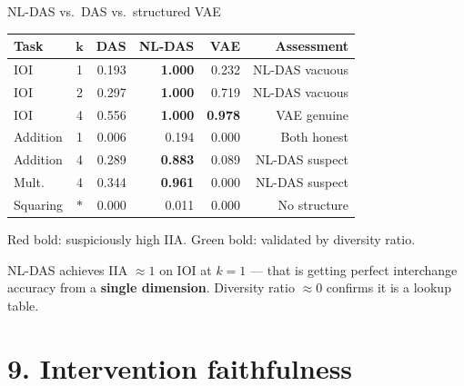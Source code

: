 \documentclass[aspectratio=169,11pt]{beamer}
\begin{document}
\begin{frame}{NL-DAS vs.\ DAS vs.\ structured VAE}

\centering
{\small\setlength{\tabcolsep}{4pt}
\begin{tabular}{lc rrrr}
\toprule
\textbf{Task} & $\boldsymbol{k}$ & \textbf{DAS} & \textbf{NL-DAS} & \textbf{VAE} & \textbf{Assessment} \\
\midrule
IOI & 1 & 0.193 & \textcolor{fail}{\textbf{1.000}} & 0.232 & NL-DAS vacuous \\
IOI & 2 & 0.297 & \textcolor{fail}{\textbf{1.000}} & 0.719 & NL-DAS vacuous \\
IOI & 4 & 0.556 & \textcolor{fail}{\textbf{1.000}} & \textcolor{pass}{\textbf{0.978}} & VAE genuine \\
Addition & 1 & 0.006 & 0.194 & 0.000 & Both honest \\
Addition & 4 & 0.289 & \textcolor{fail}{\textbf{0.883}} & 0.089 & NL-DAS suspect \\
Mult. & 4 & 0.344 & \textcolor{fail}{\textbf{0.961}} & 0.000 & NL-DAS suspect \\
Squaring & $*$ & 0.000 & 0.011 & 0.000 & No structure \\
\bottomrule
\end{tabular}}

\vspace{0.5em}
{\small \textcolor{fail}{Red bold}: suspiciously high IIA. \textcolor{pass}{Green bold}: validated by diversity ratio.}

\vspace{0.3em}
{\small NL-DAS achieves IIA $\approx 1$ on IOI at $k=1$ --- that is getting perfect interchange accuracy from a \textbf{single dimension}. Diversity ratio $\approx 0$ confirms it is a lookup table.}
\end{frame}

\section{9. Intervention faithfulness}
\end{document}
